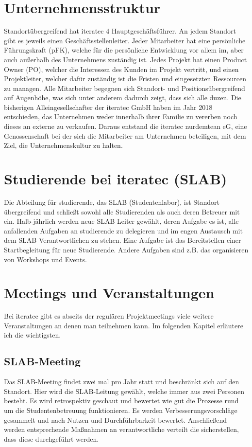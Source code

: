 \section{Unternehmensstruktur}
Standortübergreifend hat iteratec 4 Hauptgeschäftsführer. An jedem Standort gibt es jeweils einen
Geschäftsstellenleiter. Jeder Mitarbeiter hat eine persönliche Führungskraft (pFK), welche für die persönliche
Entwicklung vor allem im, aber auch außerhalb des Unternehmens zuständig ist. Jedes Projekt hat einen Product Owner
(PO), welcher die Interessen des Kunden im Projekt vertritt, und einen Projektleiter, welcher dafür zuständig ist die
Fristen und eingesetzten Ressourcen zu managen. Alle Mitarbeiter begegnen sich Standort- und Positionsübergreifend auf
Augenhöhe, was sich unter anderem dadurch zeigt, dass sich alle duzen. Die bisherigen Alleingesellschafter der iteratec
GmbH haben im Jahr 2018 entschieden, das Unternehmen weder innerhalb ihrer Familie zu vererben noch dieses an externe zu
verkaufen. Daraus entstand die iteratec nurdemtean eG, eine Genossenschaft bei der sich die Mitarbeiter am Unternehmen
beteiligen, mit dem Ziel, die Unternehmenskultur zu halten.

\section{Studierende bei iteratec (SLAB)}
Die Abteilung für studierende, das SLAB (Studentenlabor), ist Standort übergreifend und schließt sowohl alle
Studierenden als auch deren Betreuer mit ein. Halb-jährlich werden neue SLAB Leiter gewählt, deren Aufgabe es ist, alle
anfallenden Aufgaben an studierende zu delegieren und im engen Austausch mit dem SLAB-Verantwortlichen zu stehen. Eine
Aufgabe ist das Bereitstellen einer Startbegleitung für neue Studierende. Andere Aufgaben sind z.B. das organisieren von
Workshops und Events.

\section{Meetings und Veranstaltungen}
Bei iteratec gibt es abseits der regulären Projektmeetings viele weitere Veranstaltungen an denen man teilnehmen kann.
Im folgenden Kapitel erläutere ich die wichtigsten.

\subsection{SLAB-Meeting}
Das SLAB-Meeting findet zwei mal pro Jahr statt und beschränkt sich auf den Standort. Hier wird die SLAB-Leitung
gewählt, welche immer aus zwei Personen besteht. Es wird retrospektiv geschaut und bewertet wie gut die Prozesse rund um
die Studentenbetreuung funktionieren. Es werden Verbesserungsvorschläge gesammelt und nach Nutzen und Durchführbarkeit
bewertet. Anschließend werden entsprechende Maßnahmen an verantwortliche verteilt die sicherstellen, dass diese
durchgeführt werden.

